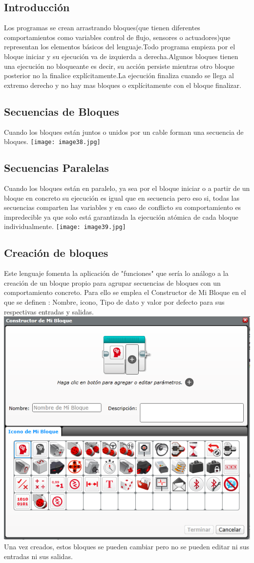 \documentclass[12pt,a4paper]{article}
\begin{document}
\subsection{Introducción}
Los programas se crean arrastrando bloques(que tienen diferentes comportamientos como variables control de flujo, sensores o actuadores)que representan los elementos básicos del lenguaje.Todo programa empieza por el bloque iniciar y su ejecución va de izquierda a derecha.Algunos bloques tienen una ejecución no bloqueante es decir, su acción persiste mientras otro bloque posterior no la finalice explícitamente.La ejecución finaliza cuando se llega al extremo derecho y no hay mas bloques o  explícitamente con el bloque finalizar.
\subsection{Secuencias de Bloques}
Cuando los bloques están juntos o unidos por un cable forman una secuencia de bloques.
\texttt{[image: image38.jpg]}
\subsection{Secuencias Paralelas}
Cuando los bloques están en paralelo, ya sea por el bloque iniciar o a partir de un bloque en concreto su ejecución es igual que en secuencia pero eso  si, todas las secuencias comparten las variables y en caso de conflicto su  comportamiento es impredecible ya que solo está garantizada la ejecución atómica de cada bloque individualmente.
\texttt{[image: image39.jpg]}
\subsection{Creación de bloques}
Este lenguaje fomenta la aplicación de "funciones" que sería lo análogo a la creación de un bloque propio para agrupar secuencias de bloques con un comportamiento concreto. Para ello se emplea el Constructor de Mi Bloque en el que se definen : Nombre, icono, Tipo de dato y  valor por defecto para sus respectivas entradas y salidas.
\includegraphics[scale=0.5]{ConstructorBloques.PNG} 
Una vez creados, estos bloques se pueden cambiar pero no se pueden editar ni sus entradas ni sus salidas.
\end{document}
